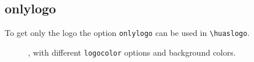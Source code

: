 \documentclass{ltxdoc}
\begin{document}
\subsection{onlylogo}
To get only the logo  the option \verb|onlylogo| can be used in \verb|\huaslogo|.
\par
\begin{figure}[h]
    \centering
\colorbox{white}{\parbox[c][0.15\textwidth][c]{0.15\textwidth}{%
\centering 
\huaslogo[scale = 1.2, onlylogo] 
}}%
\colorbox{gray!20}{\parbox[c][0.15\textwidth][c]{0.15\textwidth}{%
\centering 
\huaslogo[scale = 1.2, onlylogo] 
}}%
\colorbox{huasorange}{\parbox[c][0.15\textwidth][c]{0.15\textwidth}{%
\centering 
\huaslogo[scale = 1.2, onlylogo, logocolor = white]
}}%
\colorbox{black}{\parbox[c][0.15\textwidth][c]{0.15\textwidth}{%
\centering 
\huaslogo[scale = 1.2, onlylogo] 
}}%
\colorbox{black}{\parbox[c][0.15\textwidth][c]{0.15\textwidth}{%
\centering 
\huaslogo[scale = 1.2,onlylogo, logocolor = white] 
}}%
\colorbox{white}{\parbox[c][0.15\textwidth][c]{0.15\textwidth}{%
\centering 
\huaslogo[scale = 1.2,onlylogo, logocolor = black] 
}}%
    \caption*{\cmd{\huaslogo[scale = 1.2, onlylogo]}, with different \verb|logocolor| options and background colors.}
\end{figure}
\clearpage
\end{document}
